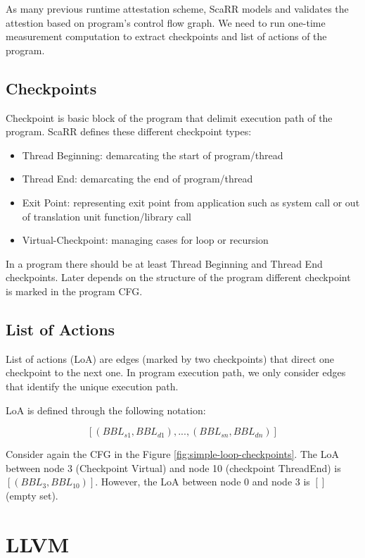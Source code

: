 As many previous runtime attestation scheme, ScaRR models and validates the attestion based on program's control flow graph. We need to run one-time measurement computation to extract checkpoints and list of actions of the program.

\subsection{Checkpoints} \label{sec:scarr-checkpoints}
Checkpoint is basic block of the program that delimit execution path of the program. ScaRR defines these different checkpoint types:
\begin{itemize}
    \item Thread Beginning: demarcating the start of program/thread
    \item Thread End: demarcating the end of program/thread
    \item Exit Point: representing exit point from application such as system call or out of translation unit function/library call
    \item Virtual-Checkpoint: managing cases for loop or recursion
\end{itemize}

In a program there should be at least Thread Beginning and Thread End checkpoints. Later depends on the structure of the program different checkpoint is marked in the program CFG.

\subsection{List of Actions}

List of actions (LoA) are edges (marked by two checkpoints) that direct one checkpoint to the next one. In program execution path, we only consider edges that identify the unique execution path.

LoA is defined through the following notation:


$$[(BBL_{s1},BBL_{d1}),...,(BBL_{sn},BBL_{dn})]$$

Consider again the CFG in the Figure \ref{fig:simple-loop-checkpoints}. The LoA between node 3 (Checkpoint Virtual) and node 10 (checkpoint ThreadEnd) is  $[(BBL_3, BBL_{10})]$. However, the LoA between node 0 and node 3 is $[]$ (empty set).


\section{LLVM}
\label{sec:llvm}

